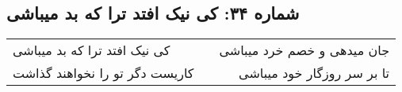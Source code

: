 \begin{center}
\section*{شماره ۳۴: کی نیک افتد ترا که بد میباشی}
\label{sec:034}
\begin{longtable}{l p{0.5cm} r}
کی نیک افتد ترا که بد میباشی
&&
جان میدهی و خصم خرد میباشی
\\
کاریست دگر تو را نخواهند گذاشت
&&
تا بر سر روزگار خود میباشی
\\
\end{longtable}
\end{center}
